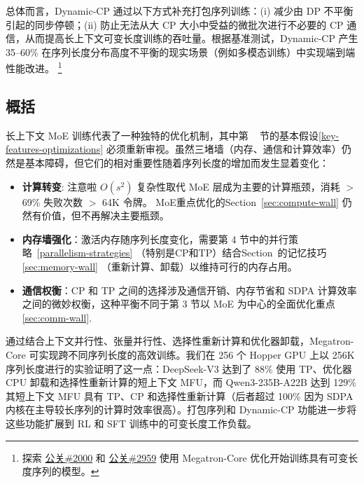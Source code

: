 \documentclass[10pt,logo,copyright]{nvidiatechreport_zh}
\begin{document}
总体而言，Dynamic-CP 通过以下方式补充打包序列训练：(i) 减少由 DP 不平衡引起的同步停顿；(ii) 防止无法从大 CP 大小中受益的微批次进行不必要的 CP 通信，从而提高长上下文可变长度训练的吞吐量。根据基准测试，Dynamic-CP 产生 35--60\% 在序列长度分布高度不平衡的现实场景（例如多模态训练）中实现端到端性能改进。 \footnote{探索 \href{https://github.com/NVIDIA/Megatron-LM/pull/2000}{公关\#2000} 和 \href{https://github.com/NVIDIA/Megatron-LM/pull/2959}{公关\#2959} 使用 Megatron-Core 优化开始训练具有可变长度序列的模型。}

\subsection{概括}

长上下文 MoE 训练代表了一种独特的优化机制，其中第 ~ 节的基本假设\ref{key-features-optimizations} 必须重新审视。虽然三堵墙（内存、通信和计算效率）仍然是基本障碍，但它们的相对重要性随着序列长度的增加而发生显着变化：

\begin{itemize}
    \item \textbf{计算转变}: 注意啦 $O(s^2)$ 复杂性取代 MoE 层成为主要的计算瓶颈，消耗 $>$ 69\% 失败次数 $>$ 64K 令牌。 MoE重点优化的Section~\ref{sec:compute-wall} 仍然有价值，但不再解决主要瓶颈。
    
    \item \textbf{内存墙强化}：激活内存随序列长度变化，需要第 4 节中的并行策略~\ref{parallelism-strategies} （特别是CP和TP）结合Section~的记忆技巧\ref{sec:memory-wall} （重新计算、卸载）以维持可行的内存占用。
    
    \item \textbf{通信权衡}：CP 和 TP 之间的选择涉及通信开销、内存节省和 SDPA 计算效率之间的微妙权衡，这种平衡不同于第 3 节以 MoE 为中心的全面优化重点\ref{sec:comm-wall}.
\end{itemize}

通过结合上下文并行性、张量并行性、选择性重新计算和优化器卸载，Megatron-Core 可实现跨不同序列长度的高效训练。我们在 256 个 Hopper GPU 上以 256K 序列长度进行的实验证明了这一点：DeepSeek-V3 达到了 88\% 使用 TP、优化器 CPU 卸载和选择性重新计算的短上下文 MFU，而 Qwen3-235B-A22B 达到 129\% 其短上下文 MFU 具有 TP、CP 和选择性重新计算（后者超过 100\% 因为 SDPA 内核在主导较长序列的计算时效率很高）。打包序列和 Dynamic-CP 功能进一步将这些功能扩展到 RL 和 SFT 训练中的可变长度工作负载。


\end{document}

